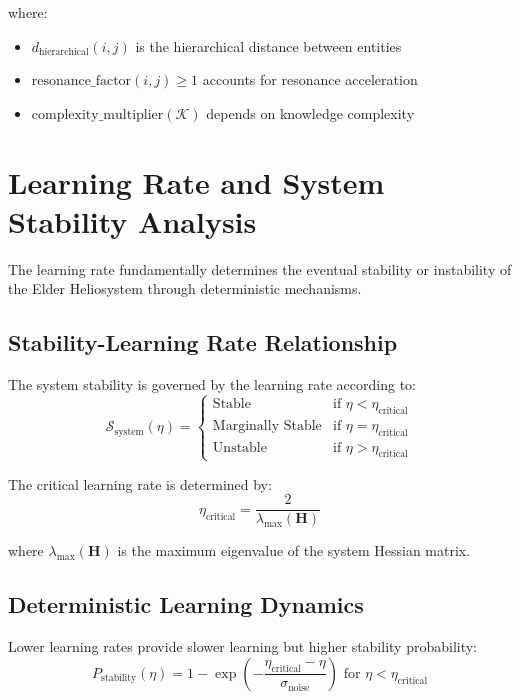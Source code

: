 where:
\begin{itemize}
    \item $d_{\text{hierarchical}}(i,j)$ is the hierarchical distance between entities
    \item $\text{resonance\_factor}(i,j) \geq 1$ accounts for resonance acceleration
    \item $\text{complexity\_multiplier}(\mathcal{K})$ depends on knowledge complexity
\end{itemize}

\section{Learning Rate and System Stability Analysis}

The learning rate fundamentally determines the eventual stability or instability of the Elder Heliosystem through deterministic mechanisms.

\subsection{Stability-Learning Rate Relationship}

The system stability is governed by the learning rate according to:
\begin{equation}
\mathcal{S}_{\text{system}}(\eta) = \begin{cases}
\text{Stable} & \text{if } \eta < \eta_{\text{critical}} \\
\text{Marginally Stable} & \text{if } \eta = \eta_{\text{critical}} \\
\text{Unstable} & \text{if } \eta > \eta_{\text{critical}}
\end{cases}
\end{equation}

The critical learning rate is determined by:
\begin{equation}
\eta_{\text{critical}} = \frac{2}{\lambda_{\text{max}}(\mathbf{H})}
\end{equation}

where $\lambda_{\text{max}}(\mathbf{H})$ is the maximum eigenvalue of the system Hessian matrix.

\subsection{Deterministic Learning Dynamics}

Lower learning rates provide slower learning but higher stability probability:
\begin{equation}
P_{\text{stability}}(\eta) = 1 - \exp\left(-\frac{\eta_{\text{critical}} - \eta}{\sigma_{\text{noise}}}\right) \text{ for } \eta < \eta_{\text{critical}}
\end{equation}

